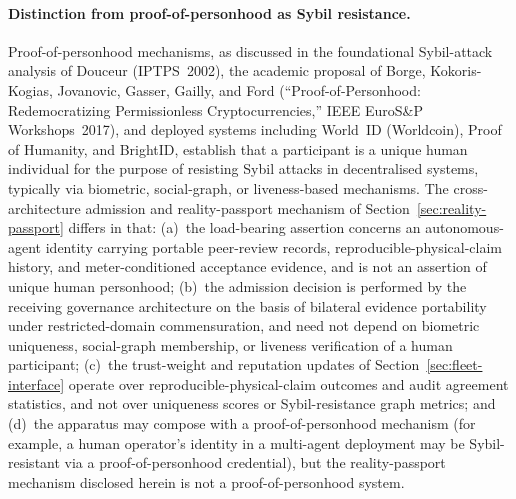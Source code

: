 \documentclass[a4paper,12pt]{article}
\begin{document}
\paragraph{Distinction from proof-of-personhood as Sybil
resistance.}
Proof-of-personhood mechanisms, as discussed in the foundational
Sybil-attack analysis of Douceur (IPTPS~2002), the academic
proposal of Borge, Kokoris-Kogias, Jovanovic, Gasser, Gailly,
and Ford (``Proof-of-Personhood: Redemocratizing Permissionless
Cryptocurrencies,'' IEEE EuroS\&P Workshops~2017), and deployed
systems including World~ID (Worldcoin), Proof of Humanity, and
BrightID, establish that a participant is a unique human
individual for the purpose of resisting Sybil attacks in
decentralised systems, typically via biometric, social-graph,
or liveness-based mechanisms. The cross-architecture admission
and reality-passport mechanism of
Section~\ref{sec:reality-passport} differs in that: (a)~the
load-bearing assertion concerns an autonomous-agent identity
carrying portable peer-review records,
reproducible-physical-claim history, and meter-conditioned
acceptance evidence, and is not an assertion of unique human
personhood; (b)~the admission decision is performed by the
receiving governance architecture on the basis of bilateral
evidence portability under restricted-domain commensuration,
and need not depend on biometric uniqueness, social-graph
membership, or liveness verification of a human participant;
(c)~the trust-weight and reputation updates of
Section~\ref{sec:fleet-interface} operate over
reproducible-physical-claim outcomes and audit agreement
statistics, and not over uniqueness scores or Sybil-resistance
graph metrics; and (d)~the apparatus may compose with a
proof-of-personhood mechanism (for example, a human operator's
identity in a multi-agent deployment may be Sybil-resistant via
a proof-of-personhood credential), but the reality-passport
mechanism disclosed herein is not a proof-of-personhood system.
\end{document}
